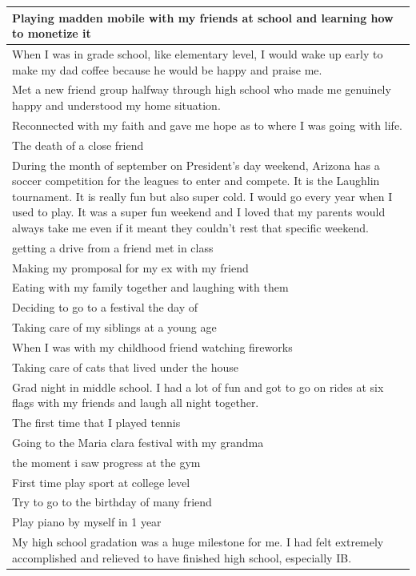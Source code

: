 \documentclass[
  .7em,
  letterpaper,
  DIV=11,
  numbers=noendperiod]{scrartcl}
\begin{document}
\begin{table}
\begin{tabular}{l}
\hline
Playing madden mobile with my friends at school and learning how to monetize it\\
\hline
When I was in grade school, like elementary level, I would wake up early to make my dad coffee because he would be happy and praise me.\\
\hline
Met a new friend group halfway through high school who made me genuinely happy and understood my home situation.\\
\hline
Reconnected with my faith and gave me hope as to where I was going with life.\\
\hline
The death of a close friend\\
\hline
During the month of september on President's day weekend, Arizona has a soccer competition for the leagues to enter and compete. It is the Laughlin tournament. It is really fun but also super cold. I would go every year when I used to play. It was a super fun weekend and I loved that my parents would always take me even if it meant they couldn't rest that specific weekend.\\
\hline
getting a drive from a friend met in class\\
\hline
Making my promposal for my ex with my friend\\
\hline
Eating with my family together and laughing with them\\
\hline
Deciding to go to a festival the day of\\
\hline
Taking care of my siblings at a young age\\
\hline
When I was with my childhood friend watching fireworks\\
\hline
Taking care of cats that lived under the house\\
\hline
Grad night in middle school. I had a lot of fun and got to go on rides at six flags with my friends and laugh all night together.\\
\hline
The first time that I played tennis\\
\hline
Going to the Maria clara festival with my grandma\\
\hline
the moment i saw progress at the gym\\
\hline
First time play sport at college level\\
\hline
Try to go to the birthday of many friend\\
\hline
Play piano by myself in 1 year\\
\hline
My high school gradation was a huge milestone for me. I had felt extremely accomplished and relieved to have finished high school, especially IB.\\

\end{tabular}
\end{table}
\end{document}

